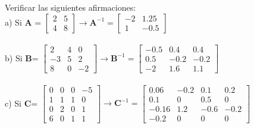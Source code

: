 \documentclass[12pt]{article}
\newenvironment{problem}[2][Problema]{\begin{trivlist}
\item[\hskip \labelsep {\bfseries #1}\hskip \labelsep {\bfseries #2.}]}{\end{trivlist}}
\begin{document}
\begin{problem}{3}
Verificar las siguientes afirmaciones:\\
a) Si \textbf{A} = 
$
\begin{bmatrix} 
2 & 5 \\
4 & 8 
\end{bmatrix} 
\rightarrow 
\mathbf{A}^{-1} = 
\begin{bmatrix}
-2 & 1.25 \\ 
1 & -0.5
\end{bmatrix}
$
\\ \\
b) Si \textbf{B}=
$
\begin{bmatrix}
2&4&0\\
-3&5&2\\
8&0&-2
\end{bmatrix}
\rightarrow
\mathbf{B}^{-1}=
\begin{bmatrix}
-0.5 & 0.4 & 0.4\\
0.5 & -0.2 & -0.2\\
-2 & 1.6 & 1.1
\end{bmatrix}
$
\\ \\
c) Si \textbf{C}=
$
\begin{bmatrix}
0&0&0&-5\\
1&1&1&0\\
0&2&0&1\\
6&0&1&1
\end{bmatrix}
\rightarrow
\mathbf{C}^{-1}=
\begin{bmatrix}
0.06 & -0.2 & 0.1 & 0.2\\
0.1 & 0 & 0.5&0\\
-0.16 & 1.2 & -0.6 & -0.2 \\
-0.2 & 0 & 0 & 0
\end{bmatrix}
$
\end{problem}
\end{document}
